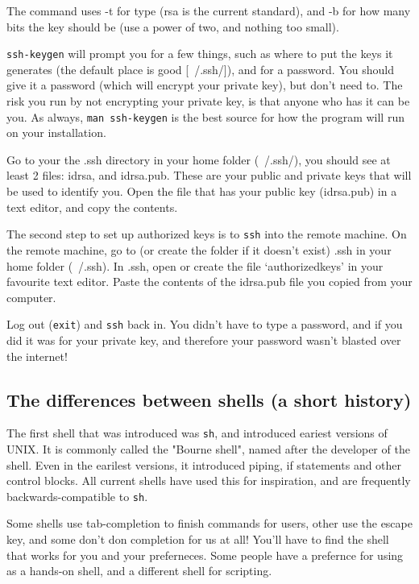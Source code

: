 The command uses -t for type (rsa 
is the current standard), and -b for how 
many bits the key should be (use a power of two, and nothing too small).

{\tt ssh-keygen} will prompt you for a few things, such as where to put the
keys it generates (the default place is good [~/.ssh/]), and for a password.
You should give it a password (which will encrypt your private key), but don't need to. 
The risk you run by not encrypting your private key, is that anyone who has it
can be you. As always, {\tt man ssh-keygen} is the best source for how the
program will run on your installation.

Go to your the .ssh directory in your home folder (~/.ssh/), you should see at 
least 2 files: id\textunderscore rsa, and id\textunderscore rsa.pub. These are your public and private keys
that will be used to identify you.  Open the file that has your public key (id\textunderscore rsa.pub)
in a text editor, and copy the contents.

The second step to set up authorized keys is to {\tt ssh} into the remote machine.
On the remote machine, go to (or create the folder if it doesn't exist) .ssh 
in your home folder (~/.ssh). In .ssh, open or create the file `authorized\textunderscore keys'
in your favourite text editor.
Paste the contents of the id\textunderscore rsa.pub file you copied from your computer.

Log out ({\tt exit}) and {\tt ssh} back in. You didn't have to type a password, and
if you did it was for your private key, and therefore your password wasn't blasted
over the internet!

\subsection{The differences between shells (a short history)}
The first shell that was introduced was {\tt sh}, and introduced eariest versions of UNIX.
It is commonly called the "Bourne shell", named after the developer of the shell.
Even in the earilest versions, it introduced piping, if statements and other control blocks.
All current shells have used this for inspiration, and are frequently backwards-compatible to
 {\tt sh}.

Some shells use tab-completion to finish commands for users, other use the escape key,
and some don't don completion for us at all! You'll have to find the shell that works
for you and your preferneces. Some people have a prefernce for using as a hands-on shell, and
a different shell for scripting.

